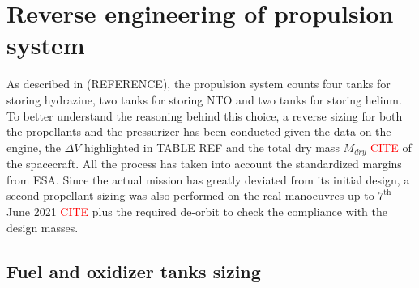 \section{Reverse engineering of propulsion system}
\label{sec:reverse_prop}

As described in (REFERENCE), the propulsion system counts four tanks for storing hydrazine, two tanks for storing NTO and two tanks for storing helium.
To better understand the reasoning behind this choice, a reverse sizing for both the propellants and the pressurizer has been conducted given the data on the engine, the $\Delta V$ highlighted in TABLE REF and the total dry mass $M_{dry}$ \textcolor{red}{CITE} of the spacecraft.
All the process has taken into account the standardized margins from ESA. \cite{esa_margins}
Since the actual mission has greatly deviated from its initial design, a second propellant sizing was also performed on the real manoeuvres up to $7^{\textrm{th}}$ June 2021 \textcolor{red}{CITE} plus the required de-orbit to check the compliance with the design masses. 

\subsection{Fuel and oxidizer tanks sizing}
\label{subsec:fuel_ox_sizing}

